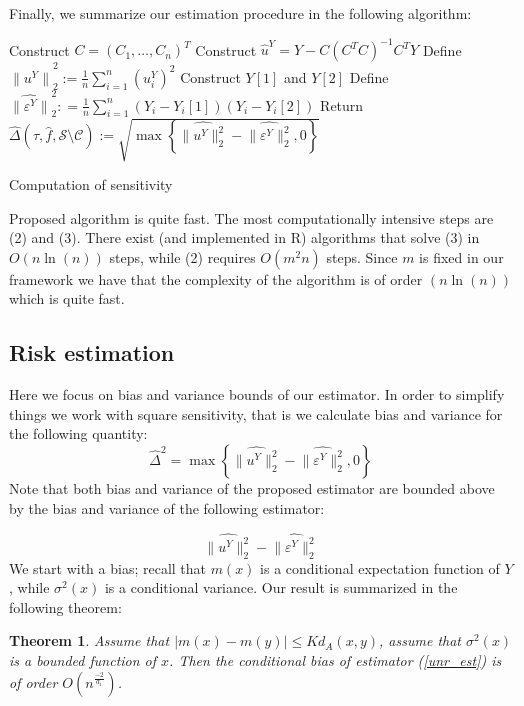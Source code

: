 \documentclass[12pt]{article}
\theoremstyle{plain}
\newtheorem{theorem}{Theorem}[section]
\begin{document}
Finally, we summarize our estimation procedure in the following algorithm:

\begin{algorithm}[H]
Construct $C = (C_1,\dots, C_n)^T$\;
Construct $\hat u^Y = Y-C\left(C^TC\right)^{-1}C^TY$\;
Define $\widehat{\|u^Y\|}_2^2:=\frac{1}{n}\sum_{i=1}^n (u_i^Y)^2$\;
Construct $Y[1]$ and $Y[2]$\;
Define $\widehat{\| \varepsilon^Y\|}_2^2 : = \frac{1}{n}\sum_{i=1}^n (Y_i-Y_i[1])(Y_i-Y_i[2])$\;
Return  $\widehat{\Delta}(\tau,\hat f, \mathcal{S}\setminus\mathcal{C}) :=   \sqrt{\max\left\{\widehat{\|u^Y\|_2^2} -\widehat{\|\varepsilon^Y\|_2^2},0\right\}}$ \;
 \caption{Computation of sensitivity}
\end{algorithm}
\hfill

Proposed algorithm is quite fast. The most computationally intensive steps are (2) and (3). There exist (and implemented in R) algorithms that solve (3) in $O(n\ln(n))$ steps, while (2) requires $O(m^2n)$ steps. Since $m$ is fixed in our framework we have that the complexity of the algorithm is of order $(n\ln(n))$ which is quite fast. 

\subsection{Risk estimation}

Here we focus on bias and variance bounds of our estimator. In order to simplify things we work with square sensitivity, that is we calculate bias and variance for the following quantity:
\begin{equation}
\hat\Delta^2 = \max\left\{\widehat{\|u^Y\|_2^2} -\widehat{\|\varepsilon^Y\|_2^2},0\right\} 
\end{equation}
Note that both bias and variance of the proposed estimator are bounded above by the bias and variance of the following  estimator:

\begin{equation}\label{unr_est}
\widehat{\|u^Y\|_2^2} -\widehat{\|\varepsilon^Y\|_2^2}
\end{equation}
We start with a bias; recall that $m(x)$ is a conditional expectation function of $Y$, while $\sigma^2(x)$ is a conditional variance.  Our result is summarized in the following theorem:

\begin{theorem}
 Assume that $|m(x)-m(y)|\le Kd_A(x,y)$, assume that $\sigma^2(x)$ is a bounded function of $x$. Then the conditional bias of estimator (\ref{unr_est}) is of order $O\left(n^{\frac{-2}{d_1}}\right)$.
 \end{theorem}
\end{document}

